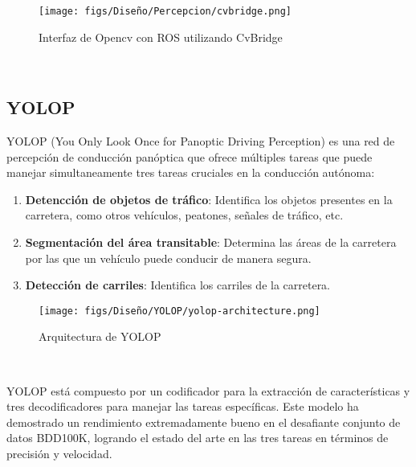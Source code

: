 \begin{figure} [H]
  \begin{center}
    \texttt{[image: figs/Diseño/Percepcion/cvbridge.png]}
  \end{center}
  \caption{Interfaz de Opencv con ROS utilizando CvBridge}
  \label{fig:CvBridge}
\end{figure}\

\newpage
\subsection{YOLOP}
\label{sec:YOLOP}
YOLOP (You Only Look Once for Panoptic Driving Perception) es una red de percepción
de conducción panóptica que ofrece múltiples tareas que puede
manejar simultaneamente tres tareas cruciales en la conducción autónoma: 
\begin{enumerate}
  \item \textbf{Detencción de objetos de tráfico}: Identifica los objetos presentes en la carretera, como otros vehículos, peatones, señales de tráfico, etc.
  \item \textbf{Segmentación del área transitable}: Determina las áreas de la carretera por las que un vehículo puede conducir de manera segura.
  \item \textbf{Detección de carriles}: Identifica los carriles de la carretera.
\end{enumerate}

\begin{figure} [H]
  \begin{center}
    \texttt{[image: figs/Diseño/YOLOP/yolop-architecture.png]}
  \end{center}
  \caption{Arquitectura de YOLOP}
  \label{fig:Arq_YOLOP}
\end{figure}\

YOLOP está compuesto por un codificador para la extracción de características y tres decodificadores para manejar las tareas específicas. Este modelo ha demostrado un rendimiento 
extremadamente bueno en el desafiante conjunto de datos BDD100K, logrando el estado del arte en las tres tareas en términos de precisión y velocidad. \newline

